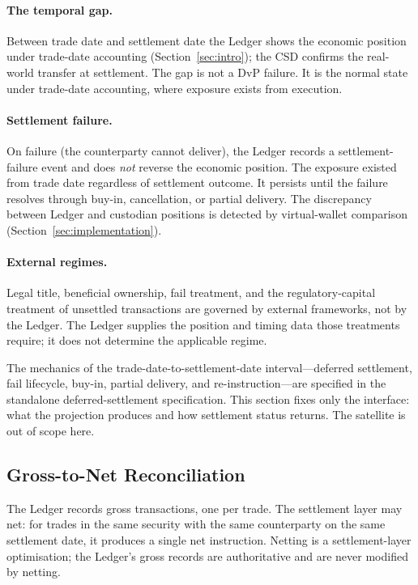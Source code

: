 \paragraph{The temporal gap.} Between trade date and settlement date the Ledger shows the economic position under trade-date accounting (Section~\ref{sec:intro}); the CSD confirms the real-world transfer at settlement. The gap is not a DvP failure. It is the normal state under trade-date accounting, where exposure exists from execution.

\paragraph{Settlement failure.} On failure (the counterparty cannot deliver), the Ledger records a settlement-failure event and does \emph{not} reverse the economic position. The exposure existed from trade date regardless of settlement outcome. It persists until the failure resolves through buy-in, cancellation, or partial delivery. The discrepancy between Ledger and custodian positions is detected by virtual-wallet comparison (Section~\ref{sec:implementation}).

\paragraph{External regimes.} Legal title, beneficial ownership, fail treatment, and the regulatory-capital treatment of unsettled transactions are governed by external frameworks, not by the Ledger. The Ledger supplies the position and timing data those treatments require; it does not determine the applicable regime.

\begin{remark}
The mechanics of the trade-date-to-settlement-date interval---deferred settlement, fail lifecycle, buy-in, partial delivery, and re-instruction---are specified in the standalone deferred-settlement specification. This section fixes only the interface: what the projection produces and how settlement status returns. The satellite is out of scope here.
\end{remark}

\subsection{Gross-to-Net Reconciliation}
\label{sec:settlement-netting}

The Ledger records gross transactions, one per trade. The settlement layer may net: for trades in the same security with the same counterparty on the same settlement date, it produces a single net instruction. Netting is a settlement-layer optimisation; the Ledger's gross records are authoritative and are never modified by netting.

